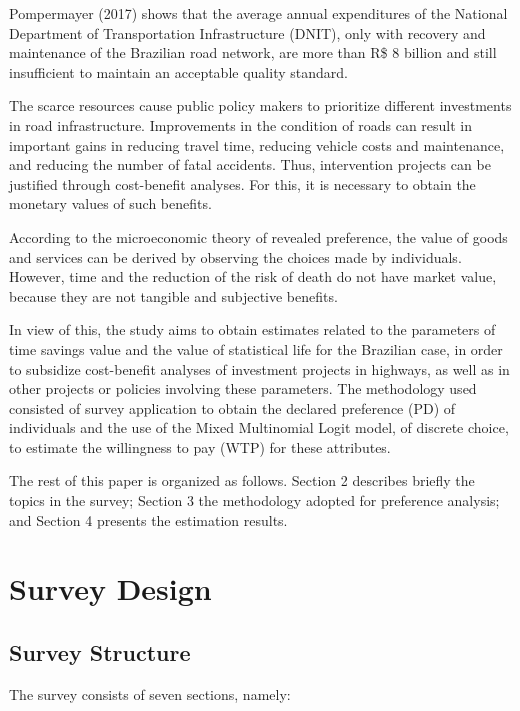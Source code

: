 \documentclass[]{elsarticle} %
\begin{document}
Pompermayer (2017) shows that the average annual expenditures of the
National Department of Transportation Infrastructure (DNIT), only with
recovery and maintenance of the Brazilian road network, are more than
R\$ 8 billion and still insufficient to maintain an acceptable quality
standard.

The scarce resources cause public policy makers to prioritize different
investments in road infrastructure. Improvements in the condition of
roads can result in important gains in reducing travel time, reducing
vehicle costs and maintenance, and reducing the number of fatal
accidents. Thus, intervention projects can be justified through
cost-benefit analyses. For this, it is necessary to obtain the monetary
values of such benefits.

According to the microeconomic theory of revealed preference, the value
of goods and services can be derived by observing the choices made by
individuals. However, time and the reduction of the risk of death do not
have market value, because they are not tangible and subjective
benefits.

In view of this, the study aims to obtain estimates related to the
parameters of time savings value and the value of statistical life for
the Brazilian case, in order to subsidize cost-benefit analyses of
investment projects in highways, as well as in other projects or
policies involving these parameters. The methodology used consisted of
survey application to obtain the declared preference (PD) of individuals
and the use of the Mixed Multinomial Logit model, of discrete choice, to
estimate the willingness to pay (WTP) for these attributes.

The rest of this paper is organized as follows. Section 2 describes
briefly the topics in the survey; Section 3 the methodology adopted for
preference analysis; and Section 4 presents the estimation results.

\hypertarget{survey-design}{%
\section{Survey Design}\label{survey-design}}

\hypertarget{survey-structure}{%
\subsection{Survey Structure}\label{survey-structure}}

The survey consists of seven sections, namely:
\end{document}
